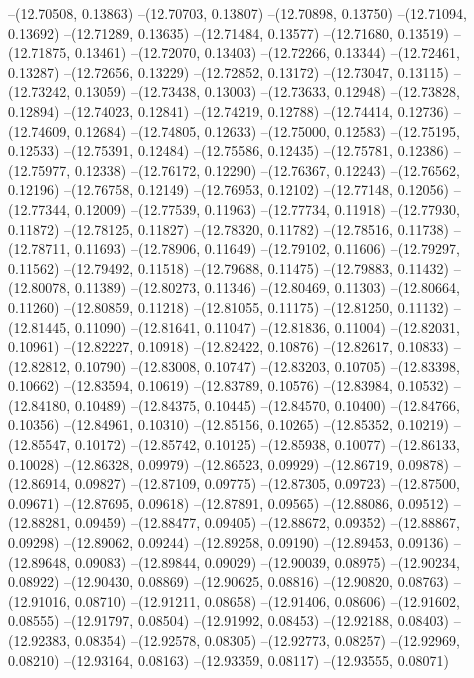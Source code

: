 --(12.70508, 0.13863)
--(12.70703, 0.13807)
--(12.70898, 0.13750)
--(12.71094, 0.13692)
--(12.71289, 0.13635)
--(12.71484, 0.13577)
--(12.71680, 0.13519)
--(12.71875, 0.13461)
--(12.72070, 0.13403)
--(12.72266, 0.13344)
--(12.72461, 0.13287)
--(12.72656, 0.13229)
--(12.72852, 0.13172)
--(12.73047, 0.13115)
--(12.73242, 0.13059)
--(12.73438, 0.13003)
--(12.73633, 0.12948)
--(12.73828, 0.12894)
--(12.74023, 0.12841)
--(12.74219, 0.12788)
--(12.74414, 0.12736)
--(12.74609, 0.12684)
--(12.74805, 0.12633)
--(12.75000, 0.12583)
--(12.75195, 0.12533)
--(12.75391, 0.12484)
--(12.75586, 0.12435)
--(12.75781, 0.12386)
--(12.75977, 0.12338)
--(12.76172, 0.12290)
--(12.76367, 0.12243)
--(12.76562, 0.12196)
--(12.76758, 0.12149)
--(12.76953, 0.12102)
--(12.77148, 0.12056)
--(12.77344, 0.12009)
--(12.77539, 0.11963)
--(12.77734, 0.11918)
--(12.77930, 0.11872)
--(12.78125, 0.11827)
--(12.78320, 0.11782)
--(12.78516, 0.11738)
--(12.78711, 0.11693)
--(12.78906, 0.11649)
--(12.79102, 0.11606)
--(12.79297, 0.11562)
--(12.79492, 0.11518)
--(12.79688, 0.11475)
--(12.79883, 0.11432)
--(12.80078, 0.11389)
--(12.80273, 0.11346)
--(12.80469, 0.11303)
--(12.80664, 0.11260)
--(12.80859, 0.11218)
--(12.81055, 0.11175)
--(12.81250, 0.11132)
--(12.81445, 0.11090)
--(12.81641, 0.11047)
--(12.81836, 0.11004)
--(12.82031, 0.10961)
--(12.82227, 0.10918)
--(12.82422, 0.10876)
--(12.82617, 0.10833)
--(12.82812, 0.10790)
--(12.83008, 0.10747)
--(12.83203, 0.10705)
--(12.83398, 0.10662)
--(12.83594, 0.10619)
--(12.83789, 0.10576)
--(12.83984, 0.10532)
--(12.84180, 0.10489)
--(12.84375, 0.10445)
--(12.84570, 0.10400)
--(12.84766, 0.10356)
--(12.84961, 0.10310)
--(12.85156, 0.10265)
--(12.85352, 0.10219)
--(12.85547, 0.10172)
--(12.85742, 0.10125)
--(12.85938, 0.10077)
--(12.86133, 0.10028)
--(12.86328, 0.09979)
--(12.86523, 0.09929)
--(12.86719, 0.09878)
--(12.86914, 0.09827)
--(12.87109, 0.09775)
--(12.87305, 0.09723)
--(12.87500, 0.09671)
--(12.87695, 0.09618)
--(12.87891, 0.09565)
--(12.88086, 0.09512)
--(12.88281, 0.09459)
--(12.88477, 0.09405)
--(12.88672, 0.09352)
--(12.88867, 0.09298)
--(12.89062, 0.09244)
--(12.89258, 0.09190)
--(12.89453, 0.09136)
--(12.89648, 0.09083)
--(12.89844, 0.09029)
--(12.90039, 0.08975)
--(12.90234, 0.08922)
--(12.90430, 0.08869)
--(12.90625, 0.08816)
--(12.90820, 0.08763)
--(12.91016, 0.08710)
--(12.91211, 0.08658)
--(12.91406, 0.08606)
--(12.91602, 0.08555)
--(12.91797, 0.08504)
--(12.91992, 0.08453)
--(12.92188, 0.08403)
--(12.92383, 0.08354)
--(12.92578, 0.08305)
--(12.92773, 0.08257)
--(12.92969, 0.08210)
--(12.93164, 0.08163)
--(12.93359, 0.08117)
--(12.93555, 0.08071)
